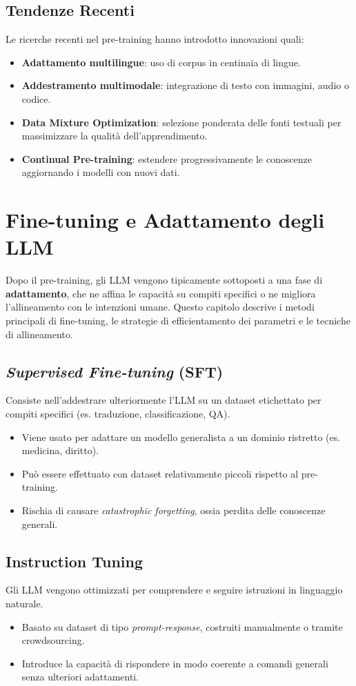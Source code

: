 \subsection{Tendenze Recenti}
Le ricerche recenti nel pre-training hanno introdotto innovazioni quali:
\begin{itemize}
    \item \textbf{Adattamento multilingue}: uso di corpus in centinaia di lingue.
    \item \textbf{Addestramento multimodale}: integrazione di testo con immagini, audio o codice.
    \item \textbf{Data Mixture Optimization}: selezione ponderata delle fonti testuali per massimizzare la qualità dell'apprendimento.
    \item \textbf{Continual Pre-training}: estendere progressivamente le conoscenze aggiornando i modelli con nuovi dati.
\end{itemize}

\newpage
\section{Fine-tuning e Adattamento degli LLM}

Dopo il pre-training, gli LLM vengono tipicamente sottoposti a una fase di \textbf{adattamento}, che ne affina le capacità su compiti specifici o 
ne migliora l'allineamento con le intenzioni umane. Questo capitolo descrive i metodi principali di fine-tuning, le strategie di efficientamento 
dei parametri e le tecniche di allineamento.

\subsection{\textit{Supervised Fine-tuning} (SFT)}
Consiste nell'addestrare ulteriormente l'LLM su un dataset etichettato per compiti specifici (es. traduzione, classificazione, QA).
\begin{itemize}
    \item Viene usato per adattare un modello generalista a un dominio ristretto (es. medicina, diritto).
    \item Può essere effettuato con dataset relativamente piccoli rispetto al pre-training.
    \item Rischia di causare \textit{catastrophic forgetting}, ossia perdita delle conoscenze generali.
\end{itemize}

\subsection{Instruction Tuning}
Gli LLM vengono ottimizzati per comprendere e seguire istruzioni in linguaggio naturale.
\begin{itemize}
    \item Basato su dataset di tipo \textit{prompt-response}, costruiti manualmente o tramite crowdsourcing.
    \item Introduce la capacità di rispondere in modo coerente a comandi generali senza ulteriori adattamenti.
\end{itemize}

